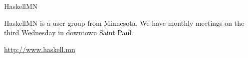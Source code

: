 \documentclass[DIV16,twocolumn,10pt]{scrreprt}
\begin{document}
\begin{hcarentry}{HaskellMN}
\makeheader

HaskellMN is a user group from Minnesota. We have monthly meetings on
the third Wednesday in downtown Saint Paul.

\FurtherReading
  \url{http://www.haskell.mn}
\end{hcarentry}
\end{document}
